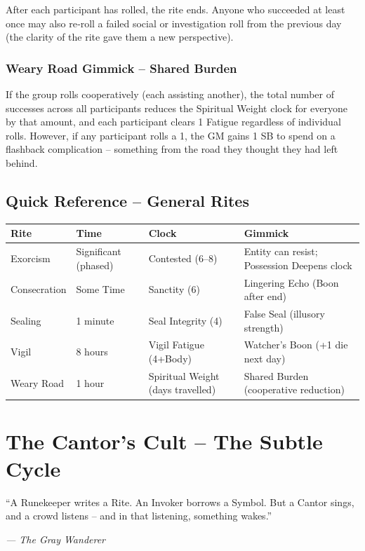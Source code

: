 \documentclass[10pt,a5paper]{book}
\begin{document}
After each participant has rolled, the rite ends. Anyone who succeeded at least once may also re‑roll a failed social or investigation roll from the previous day (the clarity of the rite gave them a new perspective).

\subsection*{Weary Road Gimmick – Shared Burden}

If the group rolls cooperatively (each assisting another), the total number of successes across all participants reduces the Spiritual Weight clock for everyone by that amount, and each participant clears 1 Fatigue regardless of individual rolls. However, if any participant rolls a 1, the GM gains 1 SB to spend on a flashback complication – something from the road they thought they had left behind.

\clearpage

\section{Quick Reference – General Rites}

\begin{longtable}{p{3cm} p{2.5cm} p{2.5cm} p{5cm}}
\toprule
Rite & Time & Clock & Gimmick \\
\midrule
Exorcism & Significant (phased) & Contested (6–8) & Entity can resist; Possession Deepens clock \\
Consecration & Some Time & Sanctity (6) & Lingering Echo (Boon after end) \\
Sealing & 1 minute & Seal Integrity (4) & False Seal (illusory strength) \\
Vigil & 8 hours & Vigil Fatigue (4+Body) & Watcher’s Boon (+1 die next day) \\
Weary Road & 1 hour & Spiritual Weight (days travelled) & Shared Burden (cooperative reduction) \\
\bottomrule
\end{longtable}

\clearpage

\chapter{The Cantor’s Cult – The Subtle Cycle}
\epigraph{“A Runekeeper writes a Rite. An Invoker borrows a Symbol. But a Cantor sings, and a crowd listens – and in that listening, something wakes.”}{\textit{— The Gray Wanderer}}
\end{document}
